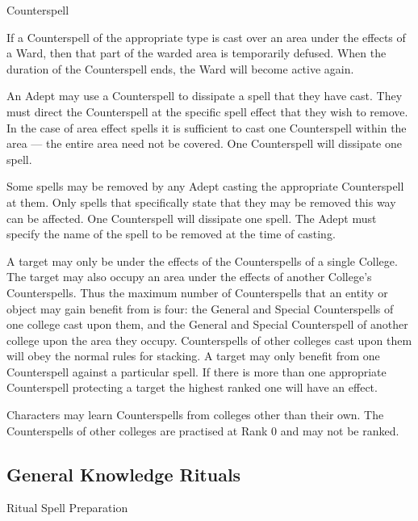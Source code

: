 \begin{multicols}{3}
\begin{spell}{Counterspell}
\begin{effects}
\begin{Enumerate}
\item If a Counterspell of the appropriate type is cast over an area
under the effects of a Ward, then that part of the warded area is
temporarily defused. When the duration of the Counterspell ends, the
Ward will become active again.

\item An Adept may use a Counterspell to dissipate a spell that they
have cast. They must direct the Counterspell at the specific spell
effect that they wish to remove. In the case of area effect spells it
is sufficient to cast one Counterspell within the area --- the entire
area need not be covered. One Counterspell will dissipate one spell.

\item Some spells may be removed by any Adept casting the appropriate
Counterspell at them. Only spells that specifically state that they
may be removed this way can be affected. One Counterspell will
dissipate one spell. The Adept must specify the name of the spell to
be removed at the time of casting.
\end{Enumerate}

A target may only be under the effects of the Counterspells of a
single College. The target may also occupy an area under the effects
of another College's Counterspells. Thus the maximum number of
Counterspells that an entity or object may gain benefit from is four:
the General and Special Counterspells of one college cast upon them,
and the General and Special Counterspell of another college upon the
area they occupy.  Counterspells of other colleges cast upon them will
obey the normal rules for stacking. A target may only benefit from one
Counterspell against a particular spell. If there is more than one
appropriate Counterspell protecting a target the highest ranked one
will have an effect.

Characters may learn Counterspells from colleges other than their
own. The Counterspells of other colleges are practised at Rank 0 and
may not be ranked.
\end{effects}
\end{spell}

\subsection{General Knowledge Rituals}

\begin{ritual}[]{Ritual Spell Preparation}
\label{magic:preparation}


\end{ritual}
\end{multicols}
